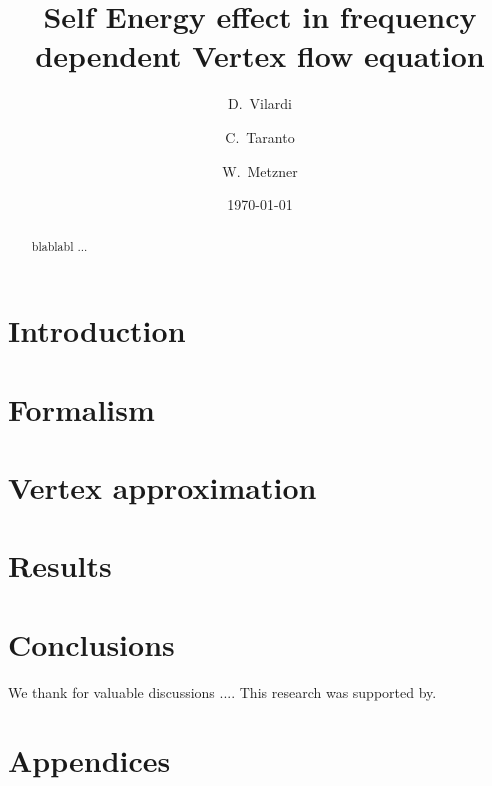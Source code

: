 \documentclass[aps,prb,twocolumn,showpacs,superscriptaddress,groupedaddress]{revtex4}
\begin{document}
\title{Self Energy effect in frequency dependent Vertex flow equation}

\author {D.~Vilardi}
\author{C.~Taranto}
\author{W.~Metzner}

\date{\today}

\begin{abstract}
blablabl ...
\end{abstract}

\pacs{}
\maketitle

\section{Introduction}
\label{sec:introduction}


\section{Formalism}
\label{sec:formalism}

\section{Vertex approximation}
\label{sec:vertex}


\section{Results}
\label{sec:results}


\section{Conclusions}
\label{sec:conclusions}


\begin{acknowledgments}
We thank  for valuable discussions .... This research was supported by.
\end{acknowledgments}

\section{Appendices}
\label{sec:appendices}




\end{document}
